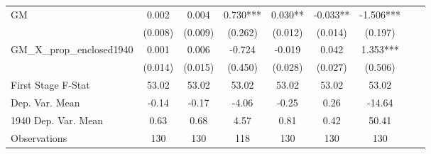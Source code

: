 \begin{tabular}{l*{8}{c}}
\cmidrule(lr){1-7}
GM              &    0.002   &    0.004   &    0.730***&    0.030** &   -0.033** &   -1.506***\\
                &  (0.008)   &  (0.009)   &  (0.262)   &  (0.012)   &  (0.014)   &  (0.197)   \\
\addlinespace
GM\_X\_prop\_enclosed1940&    0.001   &    0.006   &   -0.724   &   -0.019   &    0.042   &    1.353***\\
                &  (0.014)   &  (0.015)   &  (0.450)   &  (0.028)   &  (0.027)   &  (0.506)   \\
\midrule
First Stage F-Stat&    53.02   &    53.02   &    53.02   &    53.02   &    53.02   &    53.02   \\
Dep. Var. Mean  &    -0.14   &    -0.17   &    -4.06   &    -0.25   &     0.26   &   -14.64   \\
1940 Dep. Var. Mean&     0.63   &     0.68   &     4.57   &     0.81   &     0.42   &    50.41   \\
Observations    &      130   &      130   &      118   &      130   &      130   &      130   \\
 \bottomrule \end{tabular}
